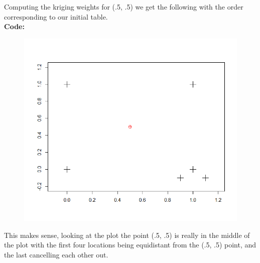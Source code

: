 \documentclass[12pt]{article}
\makeatletter
\theoremstyle{homework}
\newenvironment{exercise}[1]
{\def\@currentlabel{#1}\exercisecore}
{\endexercisecore}
\makeatother
\begin{document}
\begin{exercise}{3}
  Computing the kriging weights for (.5, .5) we get the following with the order corresponding to our initial table. 
  \begin{equation*}
    [0.237 ,0.251,  0.254,  0.267, -0.149,  0.139]
  \end{equation*}
  \textbf{Code:}
  \begin{center}
  
  \end{center}
  \begin{figure}[H]
    \begin{center}
    \includegraphics[width = \textwidth]{Rplot05.png}
    \end{center}
  \end{figure}
  This makes sense, looking at the plot the point (.5, .5) is really in the middle of the plot with the first four locations being 
  equidistant from the (.5, .5) point, and the last cancelling each other out.  \\


\end{exercise}
\end{document}
